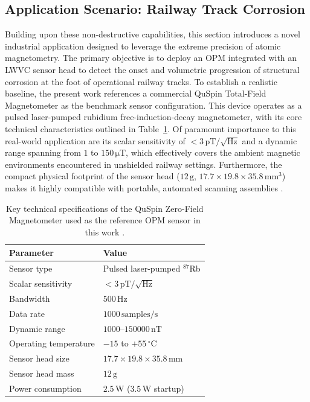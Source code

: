 \subsection{Application Scenario: Railway Track Corrosion}
\label{sec:corrosion_scenario}
Building upon these non-destructive capabilities, this section introduces a
novel industrial application designed to leverage the extreme precision of
atomic magnetometry. The primary objective is to deploy an OPM integrated
with an LWVC sensor head to detect the onset and volumetric progression of
structural corrosion at the foot of operational railway tracks. To establish
a realistic baseline, the present work references a commercial QuSpin
Total-Field Magnetometer as the benchmark sensor configuration. This device
operates as a pulsed laser-pumped rubidium free-induction-decay
magnetometer, with its core technical characteristics outlined in
Table~\ref{tab:quspin_specs}. Of paramount importance to this real-world
application are its scalar sensitivity of $<3\,\mathrm{pT}/\sqrt{\mathrm{Hz}}$
and a dynamic range spanning from $1$ to $150\,\mathrm{\mu T}$, which
effectively covers the ambient magnetic environments encountered in
unshielded railway settings. Furthermore, the compact physical footprint of
the sensor head ($12\,\mathrm{g}$, $17.7 \times 19.8 \times 35.8\,%
\mathrm{mm}^3$) makes it highly compatible with portable, automated
scanning assemblies \cite{quspin}.

\begin{table}[h]
\centering
\caption{Key technical specifications of the QuSpin Zero-Field
    Magnetometer used as the reference OPM sensor in this work
    \cite{quspin}.}
\label{tab:quspin_specs}
\begin{tabular}{ll}
    \hline
    \textbf{Parameter} & \textbf{Value} \\
    \hline
    Sensor type & Pulsed laser-pumped $^{87}$Rb \\
    Scalar sensitivity & $<3\,\mathrm{pT}/\sqrt{\mathrm{Hz}}$ \\
    Bandwidth & $500\,\mathrm{Hz}$ \\
    Data rate & $1000\,\mathrm{samples/s}$ \\
    Dynamic range & $1000$--$150000\,\mathrm{nT}$ \\
    Operating temperature & $-15$ to $+55\,^\circ\mathrm{C}$ \\
    Sensor head size & $17.7\times19.8\times35.8\,\mathrm{mm}$ \\
    Sensor head mass & $12\,\mathrm{g}$ \\
    Power consumption & $2.5\,\mathrm{W}$ ($3.5\,\mathrm{W}$ startup) \\
    \hline
    \end{tabular}
\end{table}

